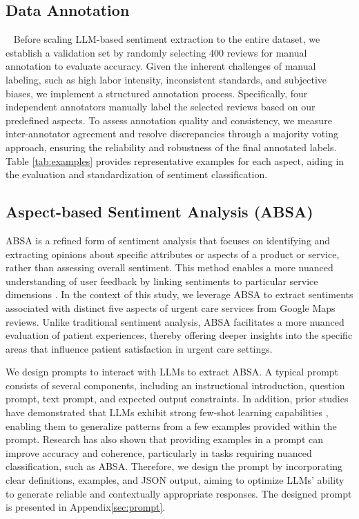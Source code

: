 \documentclass[journal,twoside,web]{ieeecolor}
\begin{document}
\subsection{Data Annotation} 
Before scaling LLM-based sentiment extraction to the entire dataset, we establish a validation set by randomly selecting 400 reviews for manual annotation to evaluate accuracy. Given the inherent challenges of manual labeling, such as high labor intensity, inconsistent standards, and subjective biases, we implement a structured annotation process. Specifically, four independent annotators manually label the selected reviews based on our predefined aspects. To assess annotation quality and consistency, we measure inter-annotator agreement and resolve discrepancies through a majority voting approach, ensuring the reliability and robustness of the final annotated labels. Table \ref{tab:examples} provides representative examples for each aspect, aiding in the evaluation and standardization of sentiment classification.

\subsection{Aspect-based Sentiment Analysis (ABSA)}
ABSA is a refined form of sentiment analysis that focuses on identifying and extracting opinions about specific attributes or aspects of a product or service, rather than assessing overall sentiment. This method enables a more nuanced understanding of user feedback by linking sentiments to particular service dimensions \cite{zhang2023survey}. In the context of this study, we leverage ABSA to extract sentiments associated with distinct five aspects of urgent care services from Google Maps reviews. Unlike traditional sentiment analysis, ABSA facilitates a more nuanced evaluation of patient experiences, thereby offering deeper insights into the specific areas that influence patient satisfaction in urgent care settings.

We design prompts to interact with LLMs to extract ABSA. A typical prompt consists of several components, including an instructional introduction, question prompt, text prompt, and expected output constraints. In addition, prior studies have demonstrated that LLMs exhibit strong few-shot learning capabilities \cite{brown2020language}, enabling them to generalize patterns from a few examples provided within the prompt. Research has also shown that providing examples in a prompt can improve accuracy and coherence, particularly in tasks requiring nuanced classification, such as ABSA. Therefore, we design the prompt by incorporating clear definitions, examples, and JSON output, aiming to optimize LLMs’ ability to generate reliable and contextually appropriate responses. The designed prompt is presented in Appendix\ref{sec:prompt}.
\end{document}
